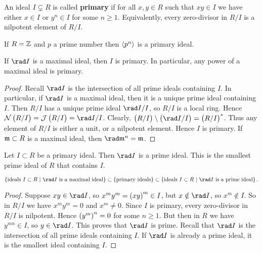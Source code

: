 \begin{definition}
An ideal $ I \subsetneq R $ is called \textbf{primary} if for all $ x, y \in R $ such that $ xy \in I $ we have either $ x \in I $ or $ y^n \in I $ for some $ n \ge 1 $. Equivalently, every zero-divisor in $ R / I $ is a nilpotent element of $ R / I $.
\end{definition}

\begin{example*}
If $ R = \mathbb{Z} $ and $ p $ a prime number then $ \left\langle p^n \right\rangle $ is a primary ideal.
\end{example*}


\begin{proposition}
\label{prop:12.2}
If $ \rad I $ is a maximal ideal, then $ I $ is primary. In particular, any power of a maximal ideal is primary.
\end{proposition}

\begin{proof}
Recall $ \rad I $ is the intersection of all prime ideals containing $ I $. In particular, if $ \rad I $ is a maximal ideal, then it is a unique prime ideal containing $ I $. Then $ R / I $ has a unique prime ideal $ \rad I / I $, so $ R / I $ is a local ring. Hence $ \NNN\br{R / I} = \JJJ\br{R / I} = \rad I / I $. Clearly, $ \br{R / I} \setminus \br{\rad I / I} = \br{R / I}^* $. Thus any element of $ R / I $ is either a unit, or a nilpotent element. Hence $ I $ is primary. If $ \mathfrak{m} \subset R $ is a maximal ideal, then $ \rad \mmm^n = \mmm $.
\end{proof}

\begin{proposition}
Let $ I \subset R $ be a primary ideal. Then $ \rad I $ is a prime ideal. This is the smallest prime ideal of $ R $ that contains $ I $.
\end{proposition}

\begin{remark*}
$$ \cbr{\text{ideals} \ I \subset R \st \rad I \ \text{is a maximal ideal}} \subset \cbr{\text{primary ideals}} \subset \cbr{\text{ideals} \ I \subset R \st \rad I \ \text{is a prime ideal}}. $$
\end{remark*}

\begin{proof}
Suppose $ xy \in \rad I $, so $ x^my^m = \br{xy}^m \in I $, but $ x \notin \rad I $, so $ x^m \notin I $. So in $ R / I $ we have $ x^my^m = 0 $ and $ x^m \ne 0 $. Since $ I $ is primary, every zero-divisor in $ R / I $ is nilpotent. Hence $ \br{y^m}^n = 0 $ for some $ n \ge 1 $. But then in $ R $ we have $ y^{mn} \in I $, so $ y \in \rad I $. This proves that $ \rad I $ is prime. Recall that $ \rad I $ is the intersection of all prime ideals containing $ I $. If $ \rad I $ is already a prime ideal, it is the smallest ideal containing $ I $.
\end{proof}

